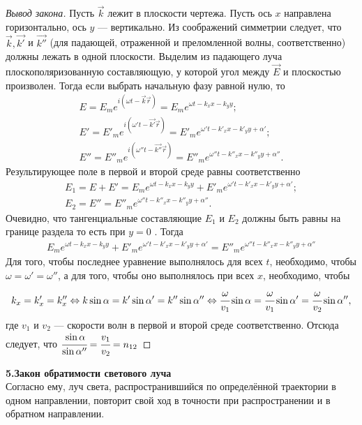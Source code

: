 \begin{proof}[Вывод закона]
	Пусть $ \vec{k}$ лежит в плоскости чертежа. Пусть ось $x$ направлена горизонтально, ось $y$ — вертикально. Из соображений симметрии следует, что$ \vec{k}, \vec{k'}$ и $\vec{k''}$ (для падающей, отраженной и преломленной волны, соответственно) должны лежать в одной плоскости.
	Выделим из падающего луча плоскополяризованную составляющую, у которой угол между ${\vec {E}}$ и плоскостью произволен. Тогда если выбрать начальную фазу равной нулю, то
	\begin{gather*}
	E=E_{m}e^{{i(\omega t-{\vec  {k}}{\vec  {r}})}}=E_{m}e^{{\omega t-k_{x}x-k_{y}y}};\\
	E'=E'_{m}e^{{i(\omega 't-{\vec  {k'}}{\vec  {r}})}}=E'_{m}e^{{\omega 't-k'_{x}x-k'_{y}y+\alpha '}};\\
	 E''=E''_{m}e^{{i(\omega ''t-{\vec  {k''}}{\vec  {r}})}}=E''_{m}e^{{\omega ''t-k''_{x}x-k''_{y}y+\alpha ''}}.
	\end{gather*}
	Результирующее поле в первой и второй среде равны соответственно
	\begin{gather*}
	 E_{1}=E+E'=E_{m}e^{{\omega t-k_{x}x-k_{y}y}}+E'_{m}e^{{\omega 't-k'_{x}x-k'_{y}y+\alpha '}};\\
	 E_2 = E'' = E''_m e^{\omega'' t - k''_x x - k''_y y + \alpha''} .
	\end{gather*} 
	Очевидно, что тангенциальные составляющие $E_1$ и $E_2$ должны быть равны на границе раздела то есть при $ y=0$ .
	Тогда
	\begin{gather*}
	 E_m e^{\omega t - k_x x - k_y y} + E'_m e^{\omega' t - k'_x x - k'_y y + \alpha'} = E''_m e^{\omega'' t - k''_x x - k''_y y + \alpha''}
	\end{gather*}
	Для того, чтобы последнее уравнение выполнялось для всех  $t$, необходимо, чтобы $ \omega = \omega' = \omega''$, а для того, чтобы оно выполнялось при всех $x$,  необходимо, чтобы
	\begin{gather*}
 k_x = k'_x = k''_x \Leftrightarrow k\sin{\alpha} = k'\sin{\alpha'} = k''\sin{\alpha''} \Leftrightarrow \cfrac {\omega} {v_1} \sin{\alpha} = \cfrac {\omega} {v_1} \sin{\alpha'} =  \cfrac {\omega} {v_2} \sin{\alpha''}, 
	\end{gather*}
	где
	$v_{1}$ и $v_{2}$ — скорости волн в первой и второй среде соответственно.
	Отсюда следует, что  $\cfrac {\sin {\alpha }}{\sin {\alpha ''}}=\cfrac {v_{1}}{v_{2}}=n_{12}$
\end{proof}
	\textbf{5.Закон обратимости светового луча}\\
	Согласно ему, луч света, распространившийся по определённой траектории в одном направлении, повторит свой ход в точности при распространении и в обратном направлении.\\
